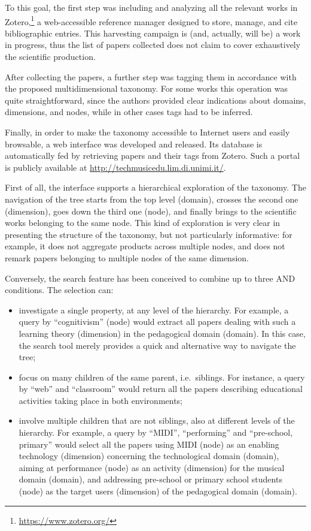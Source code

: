 \documentclass[journal]{IEEEtran}
\begin{document}
To this goal, the first step was including and analyzing all the relevant works in Zotero,\footnote{\url{https://www.zotero.org/}} a web-accessible reference manager designed to store, manage, and cite bibliographic entries. This harvesting campaign is (and, actually, will be) a work in progress, thus the list of papers collected does not claim to cover exhaustively the scientific production.

After collecting the papers, a further step was tagging them in accordance with the proposed multidimensional taxonomy. For some works this operation was quite straightforward, since the authors provided clear indications about domains, dimensions, and nodes, while in other cases tags had to be inferred. 

Finally, in order to make the taxonomy accessible to Internet users and easily browsable, a web interface was developed and released. Its database is automatically fed by retrieving papers and their tags from Zotero. Such a portal is publicly available at \url{http://techmusicedu.lim.di.unimi.it/}.

First of all, the interface supports a hierarchical exploration of the taxonomy. The navigation of the tree starts from the top level (domain), crosses the second one (dimension), goes down the third one (node), and finally brings to the scientific works belonging to the same node. This kind of exploration is very clear in presenting the structure of the taxonomy, but not particularly informative: for example, it does not aggregate products across multiple nodes, and does not remark papers belonging to multiple nodes of the same dimension. 

Conversely, the search feature has been conceived to combine up to three AND conditions. The selection can:

\begin{itemize}
\item investigate a single property, at any level of the hierarchy. For example, a query by ``cognitivism'' (node) would extract all papers dealing with such a learning theory (dimension) in the pedagogical domain (domain). In this case, the search tool merely provides a quick and alternative way to navigate the tree;
\item focus on many children of the same parent, i.e.\ siblings. For instance, a query by ``web'' and ``classroom'' would return all the papers describing educational activities taking place in both environments;
\item involve multiple children that are not siblings, also at different levels of the hierarchy. For example, a query by ``MIDI'', ``performing'' and ``pre-school, primary'' would select all the papers using MIDI (node) as an enabling technology (dimension) concerning the technological domain (domain), aiming at performance (node) as an activity (dimension) for the musical domain (domain), and addressing pre-school or primary school students (node) as the target users (dimension) of the pedagogical domain (domain).
\end{itemize}
\end{document}
